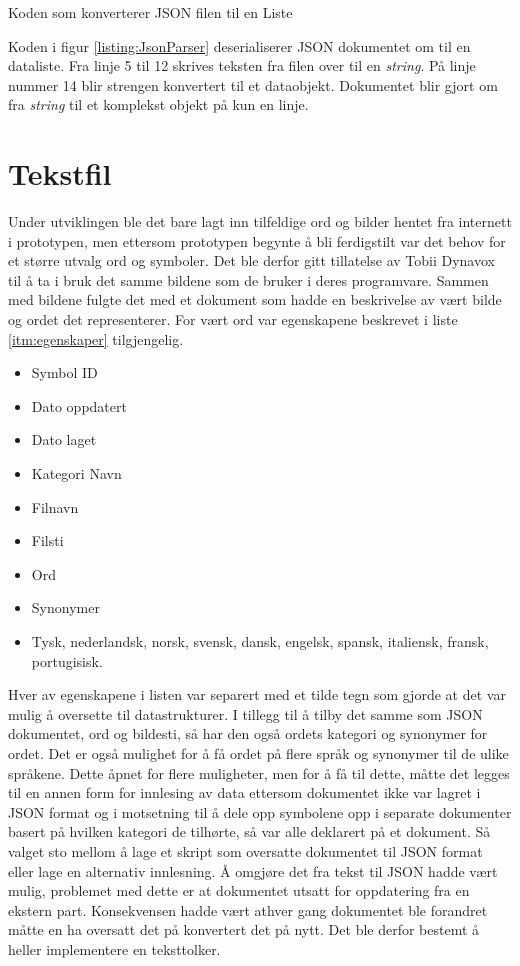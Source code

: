 \begin{listing}[ht] 
\inputminted[fontsize=\footnotesize, frame=lines,framesep=2mm,baselinestretch=1.2,bgcolor=lightgray,linenos]{csharp}{Code/JSONparser.cs} 
\caption{Koden som konverterer JSON filen til en Liste} 
\label{listing:JsonParser} 
\end{listing} 


Koden i figur \ref{listing:JsonParser} deserialiserer JSON dokumentet om til en dataliste. Fra linje 5 til 12 skrives teksten fra filen over til en \textit{string}. På linje nummer 14 blir strengen konvertert til et dataobjekt. Dokumentet blir gjort om fra \textit{string} til et komplekst objekt på kun en linje. 


\section{Tekstfil}

Under utviklingen ble det bare lagt inn tilfeldige ord og bilder hentet fra internett i prototypen, men ettersom prototypen begynte å bli ferdigstilt var det behov for et større utvalg ord og symboler. Det ble derfor gitt tillatelse av Tobii Dynavox til å ta i bruk det samme bildene som de bruker i deres programvare. Sammen med bildene fulgte det med et dokument som hadde en beskrivelse av vært bilde og ordet det representerer. For vært ord var egenskapene beskrevet i liste \ref{itm:egenskaper} tilgjengelig. 

\begin{itemize}
\label{itm:egenskaper}
\item Symbol ID
\item Dato oppdatert
\item Dato laget
\item Kategori Navn 
\item Filnavn
\item Filsti
\item Ord
\item Synonymer
\item Tysk, nederlandsk, norsk, svensk, dansk, engelsk, spansk, italiensk, fransk, portugisisk.
\end{itemize}


Hver av egenskapene i listen var separert med et tilde tegn som gjorde at det var mulig å oversette til datastrukturer. I tillegg til å tilby det samme som JSON dokumentet, ord og bildesti, så har den også ordets kategori og synonymer for ordet. Det er også mulighet for å få ordet på flere språk og synonymer til de ulike språkene. Dette åpnet for flere muligheter, men for å få til dette, måtte det legges til en annen form for innlesing av data ettersom dokumentet ikke var lagret i JSON format og i motsetning til å dele opp symbolene opp i separate dokumenter basert på hvilken kategori de tilhørte, så var alle deklarert på et dokument. Så  valget sto mellom å lage et skript som oversatte dokumentet til JSON format eller lage en alternativ innlesning. Å omgjøre det fra tekst til JSON hadde vært mulig, problemet med dette er at dokumentet utsatt for oppdatering fra en ekstern part. Konsekvensen hadde vært athver gang dokumentet ble forandret måtte en ha oversatt det på konvertert det på nytt. Det ble derfor bestemt å heller implementere en teksttolker. 
